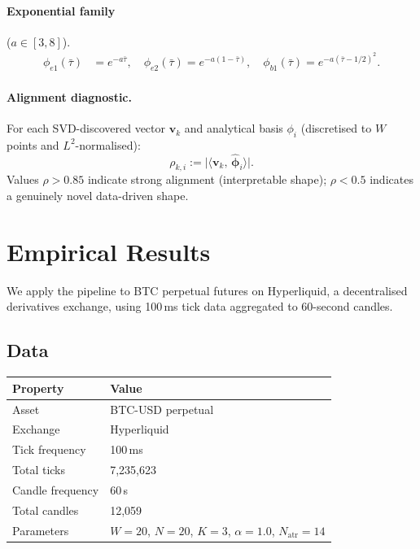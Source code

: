 \documentclass[11pt,a4paper]{article}
\theoremstyle{definition}
\theoremstyle{plain}
\newcommand{\bvec}[1]{\mathbf{#1}}
\newcommand{\inner}[2]{\langle #1,\, #2 \rangle}
\begin{document}
\paragraph{Exponential family} ($a \in [3,8]$).
\begin{align}
    \phi_{e1}(\bar{\tau}) &= e^{-a\bar{\tau}}, \quad
    \phi_{e2}(\bar{\tau}) = e^{-a(1-\bar{\tau})}, \quad
    \phi_{b1}(\bar{\tau}) = e^{-a(\bar{\tau}-1/2)^2}.
    \label{eq:exp_basis}
\end{align}

\paragraph{Alignment diagnostic.}
For each SVD-discovered vector $\bvec{v}_k$ and analytical basis $\phi_i$
(discretised to $W$ points and $L^2$-normalised):
\begin{equation}
    \rho_{k,i} :=
    \bigl|\inner{\bvec{v}_k}{\hat{\boldsymbol{\phi}}_i}\bigr|.
    \label{eq:alignment}
\end{equation}
Values $\rho > 0.85$ indicate strong alignment (interpretable shape);
$\rho < 0.5$ indicates a genuinely novel data-driven shape.

\section{Empirical Results}
\label{sec:results}

We apply the pipeline to BTC perpetual futures on Hyperliquid, a
decentralised derivatives exchange, using 100\,ms tick data aggregated to
60-second candles.

\subsection{Data}

\begin{center}
\begin{tabular}{ll}
\hline
\textbf{Property} & \textbf{Value} \\
\hline
Asset              & BTC-USD perpetual \\
Exchange           & Hyperliquid \\
Tick frequency     & 100\,ms \\
Total ticks        & 7,235,623 \\
Candle frequency   & 60\,s \\
Total candles      & 12,059 \\
Parameters         & $W=20$, $N=20$, $K=3$, $\alpha=1.0$, $N_\text{atr}=14$ \\
\hline
\end{tabular}
\end{center}
\end{document}
